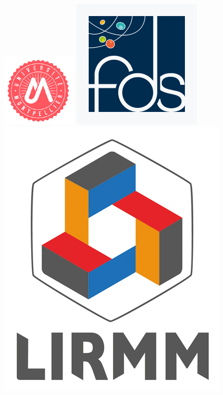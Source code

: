 \documentclass[a4paper,12pt]{report}
\theoremstyle{break}
\theoremstyle{break}
\theoremstyle{break}
\theoremstyle{break}
\theoremstyle{definition}
\theoremstyle{remark}
\begin{document}
\begin{titlepage}
\centering
\includegraphics[scale=0.5]{images/umLogo.png} %
\hspace{\fill}
\includegraphics[scale=0.25]{images/fdsLogo.jpg} %
\hspace{\fill}
\includegraphics[scale=0.25]{images/lirmmLogo.png}~\\[2cm] %

\end{titlepage}
\end{document}
